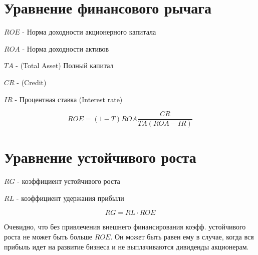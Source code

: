 \section{Уравнение финансового рычага}

$ ROE $ - Норма доходности акционерного капитала

$ ROA  $ - Норма доходности активов

$ TA  $ - (Total Asset) Полный капитал

$ CR  $ - (Credit)

$ IR  $ - Процентная ставка (Interest rate)

$$ ROE = (1 - T)ROA \dfrac{CR}{TA(ROA-IR)} $$

\section{Уравнение устойчивого роста}

$ RG $ - коэффициент устойчивого роста

$ RL $ - коэффициент удержания прибыли

$$ RG = RL \cdot ROE $$

Очевидно, что без привлечения внешнего финансирования коэфф. устойчивого роста не может быть больше $ ROE $.
Он может быть равен ему в случае, когда вся прибыль идет на развитие бизнеса и не выплачиваются дивиденды акционерам.